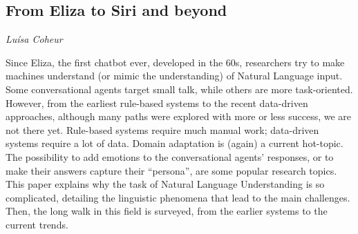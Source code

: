 \documentclass[../booklet.tex]{subfiles}
\begin{document}
\subsection[From Eliza to Siri and beyond. {\it Luísa Coheur}]{From Eliza to Siri and beyond}

\begin{center}
  {\it Luísa Coheur}
\end{center}

\vskip 0.8cm


Since Eliza, the first chatbot ever, developed in the 60s, researchers try to make machines understand (or mimic the understanding) of Natural Language input. Some conversational agents target small talk, while others are more task-oriented. However, from the earliest rule-based systems to the recent data-driven approaches, although many paths were explored with more or less success, we are not there yet. Rule-based systems require much manual work; data-driven systems require a lot of data. Domain adaptation is (again) a current hot-topic. The possibility to add emotions to the conversational agents' responses, or to make their answers capture their ``persona'', are some popular research topics. 
This paper explains why the task of Natural Language Understanding is so complicated, detailing the linguistic phenomena that lead to the main challenges. Then, the long walk in this field is surveyed, from the earlier systems to the current trends.
\end{document}
